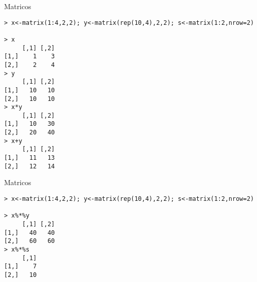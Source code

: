 \documentclass[11pt,xcolor=table]{beamer}
\begin{document}

\begin{frame}[fragile]{Matricos}
\begin{lstlisting}
> x<-matrix(1:4,2,2); y<-matrix(rep(10,4),2,2); s<-matrix(1:2,nrow=2)

> x
     [,1] [,2]
[1,]    1    3
[2,]    2    4
> y
     [,1] [,2]
[1,]   10   10
[2,]   10   10
> x*y
     [,1] [,2]
[1,]   10   30
[2,]   20   40
> x+y
     [,1] [,2]
[1,]   11   13
[2,]   12   14
\end{lstlisting}
\end{frame}

\begin{frame}[fragile]{Matricos}
\begin{lstlisting}
> x<-matrix(1:4,2,2); y<-matrix(rep(10,4),2,2); s<-matrix(1:2,nrow=2)

> x%*%y
     [,1] [,2]
[1,]   40   40
[2,]   60   60
> x%*%s
     [,1]
[1,]    7
[2,]   10
\end{lstlisting}
\end{frame}
\end{document}
